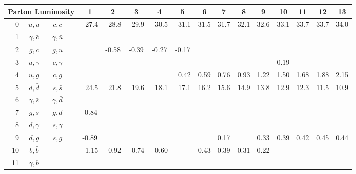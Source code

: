 \begin{tabular}{rcccccccccccccccc}
  \toprule
  \multicolumn{4}{c}{Parton Luminosity}                      &    1  &    2  &     3 &     4 &     5 &    6 &    7 &    8 &    9 &   10 &   11 &   12 &   13 \\
  \midrule
   0 & $u,\bar u$       & $ c,\bar c$      &                 &\ 27.4 &\ 28.8 &\ 29.9 &\ 30.5 &\ 31.1 & 31.5 & 31.7 & 32.1 & 32.6 & 33.1 & 33.7 & 33.7 & 34.0 \\
   1 & $\gamma,\bar c$  & $\gamma, \bar u$ &                 &       &       &       &       &       &      &      &      &      &      &      &      &      \\
   2 & $g,\bar c$       & $g,\bar u$       &                 &       &-0.58  & -0.39 & -0.27 & -0.17 &      &      &      &      &      &      &      &      \\
   3 & $u,\gamma$       & $c,\gamma$       &                 &       &       &       &       &       &      &      &      &      & 0.19 &      &      &      \\
   4 & $u,g$            & $c,g$            &                 &       &       &       &       &\ 0.42 & 0.59 & 0.76 & 0.93 & 1.22 & 1.50 & 1.68 & 1.88 & 2.15 \\
   5 & $d,\bar d$       & $s,\bar s$       &                 &\ 24.5 &\ 21.8 &\ 19.6 &\ 18.1 &\ 17.1 & 16.2 & 15.6 & 14.9 & 13.8 & 12.9 & 12.3 & 11.5 & 10.9 \\
   6 & $\gamma, \bar s$ & $\gamma, \bar d$ &                 &       &       &       &       &       &      &      &      &      &      &      &      &      \\
   7 & $g,\bar s$       & $g,\bar d$       &                 & -0.84 &       &       &       &       &      &      &      &      &      &      &      &      \\
   8 & $d,\gamma$       & $s,\gamma$       &                 &       &       &       &       &       &      &      &      &      &      &      &      &      \\
   9 & $d,g$            & $s,g$            &                 & -0.89 &       &       &       &       &      & 0.17 &      & 0.33 & 0.39 & 0.42 & 0.45 & 0.44 \\
  10 & $b,\bar b$       &                  &                 &\ 1.15 &\ 0.92 &\ 0.74 &\ 0.60 &       & 0.43 & 0.39 & 0.31 & 0.22 &      &      &      &      \\
  11 & $\gamma,\bar b$  &                  &                 &       &       &       &       &       &      &      &      &      &      &      &      &      \\

\end{tabular}

